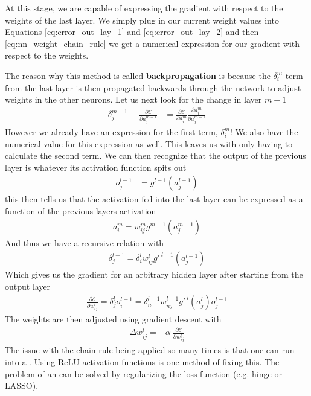At this stage, we are capable of expressing the gradient with respect to the weights of the last layer. We simply plug in our current weight values into Equations \ref{eq:error_out_lay_1} and \ref{eq:error_out_lay_2} and then \ref{eq:nn_weight_chain_rule} we get a numerical expression for our gradient with respect to the weights. 



The reason why this method is called \textbf{backpropagation} is because the $\delta_i^m$ term from the last layer is then propagated backwards through the network to adjust weights in the other neurons. Let us next look for the change in layer $m-1$
\begin{align}
	\delta_j^{m-1} \equiv \frac{\partial \mathcal{E}}{\partial a_{j}^{m-1}} &= \frac{\partial \mathcal{E}}{\partial a_{i}^{m}}\frac{\partial a_{i}^{m}}{\partial a_{j}^{m-1}}
\end{align}
However we already have an expression for the first term, $\delta_i^m$! We also have the numerical value for this expression as well. This leaves us with only having to calculate the second term.
We can then recognize that the output of the previous layer is whatever its activation function spits out
\begin{align}
	o_j^{l-1} &= g^{l-1}(a_j^{l-1})
\end{align}
this then tells us that the activation fed into the last layer can be expressed as a function of the previous layers activation
\begin{align}
	a_i^m = w_{ij}^m g^{m-1}(a_j^{m-1})
\end{align}
And thus we have a recursive relation with
\begin{align}
	\delta_j^{l-1} = \delta_i^l w_{ij}^l g'^{~l-1}(a_j^{l-1})
\end{align}
Which gives us the gradient for an arbitrary hidden layer  after starting from the output layer
\begin{align}
	\frac{\partial \mathcal{E}}{\partial w_{ij}^l} = \delta_j^{l}o_i^{l-1} = \delta_n^{l+1} w_{nj}^{l+1} g'^{~l}(a_j^{l})o_j^{l-1}
\end{align}
The weights are then adjusted using gradient descent with
\begin{align}
	\Delta w_{ij}^l = -\alpha~  \frac{\partial \mathcal{E}}{\partial w_{ij}^l}
\end{align}
The issue with the chain rule being applied so many times is that one can run into a . Using ReLU activation functions is one method of fixing this. The problem of an   can be solved by regularizing the loss function (e.g. hinge or LASSO).
